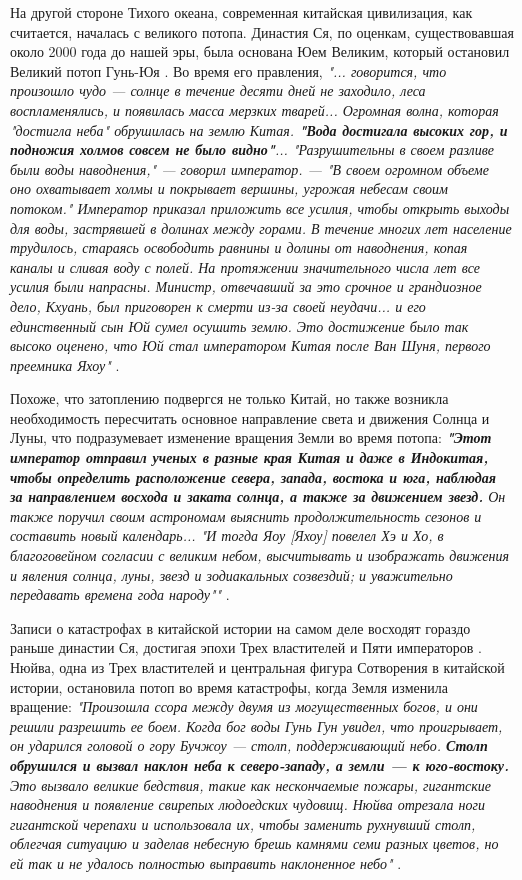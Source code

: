 \documentclass[10pt,twocolumn,letterpaper]{article}
\begin{document}
На другой стороне Тихого океана, современная китайская цивилизация, как считается, началась с великого потопа. Династия Ся, по оценкам, существовавшая около 2000 года до нашей эры, была основана Юем Великим, который остановил Великий потоп Гунь-Юя \cite{6}. Во время его правления, \textit{"... говорится, что произошло чудо — солнце в течение десяти дней не заходило, леса воспламенялись, и появилась масса мерзких тварей... Огромная волна, которая "достигла неба" обрушилась на землю Китая. \textbf{"Вода достигала высоких гор, и подножия холмов совсем не было видно"}... "Разрушительны в своем разливе были воды наводнения," — говорил император. — "В своем огромном объеме оно охватывает холмы и покрывает вершины, угрожая небесам своим потоком." Император приказал приложить все усилия, чтобы открыть выходы для воды, застрявшей в долинах между горами. В течение многих лет население трудилось, стараясь освободить равнины и долины от наводнения, копая каналы и сливая воду с полей. На протяжении значительного числа лет все усилия были напрасны. Министр, отвечавший за это срочное и грандиозное дело, Кхуань, был приговорен к смерти из-за своей неудачи... и его единственный сын Юй сумел осушить землю. Это достижение было так высоко оценено, что Юй стал императором Китая после Ван Шуня, первого преемника Яхоу"} \cite{5}.

Похоже, что затоплению подвергся не только Китай, но также возникла необходимость пересчитать основное направление света и движения Солнца и Луны, что подразумевает изменение вращения Земли во время потопа: \textit{\textbf{"Этот император отправил ученых в разные края Китая и даже в Индокитая, чтобы определить расположение севера, запада, востока и юга, наблюдая за направлением восхода и заката солнца, а также за движением звезд.} Он также поручил своим астрономам выяснить продолжительность сезонов и составить новый календарь... "И тогда Яоу [Яхоу] повелел Хэ и Хо, в благоговейном согласии с великим небом, высчитывать и изображать движения и явления солнца, луны, звезд и зодиакальных созвездий; и уважительно передавать времена года народу""} \cite{5}.

Записи о катастрофах в китайской истории на самом деле восходят гораздо раньше династии Ся, достигая эпохи Трех властителей и Пяти императоров \cite{7}. Нюйва, одна из Трех властителей и центральная фигура Сотворения в китайской истории, остановила потоп во время катастрофы, когда Земля изменила вращение: \textit{"Произошла ссора между двумя из могущественных богов, и они решили разрешить ее боем. Когда бог воды Гунь Гун увидел, что проигрывает, он ударился головой о гору Бучжоу — столп, поддерживающий небо. \textbf{Столп обрушился и вызвал наклон неба к северо-западу, а земли — к юго-востоку.} Это вызвало великие бедствия, такие как нескончаемые пожары, гигантские наводнения и появление свирепых людоедских чудовищ. Нюйва отрезала ноги гигантской черепахи и использовала их, чтобы заменить рухнувший столп, облегчая ситуацию и заделав небесную брешь камнями семи разных цветов, но ей так и не удалось полностью выправить наклоненное небо"} \cite{8}.
\end{document}
